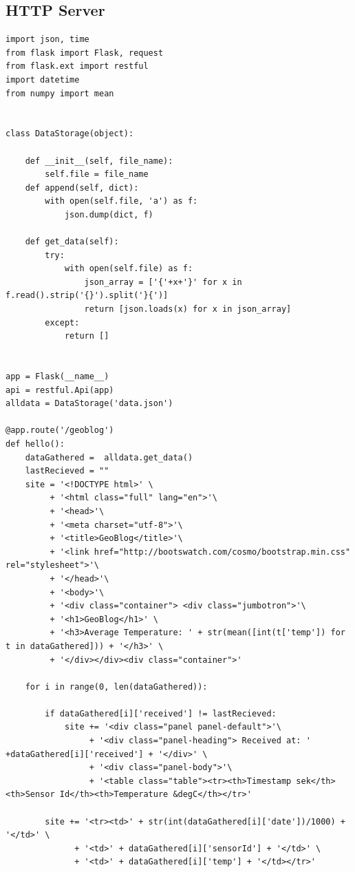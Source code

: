 \subsection*{HTTP Server}
\begin{lstlisting}[frame=single, label=httpCode, caption={Code for the HTTP server language=Python}]
import json, time
from flask import Flask, request
from flask.ext import restful
import datetime
from numpy import mean


class DataStorage(object):
    
    def __init__(self, file_name):
        self.file = file_name
    def append(self, dict):
        with open(self.file, 'a') as f:
            json.dump(dict, f)

    def get_data(self):
        try:
            with open(self.file) as f:
                json_array = ['{'+x+'}' for x in f.read().strip('{}').split('}{')]
                return [json.loads(x) for x in json_array]
        except:
            return []      


app = Flask(__name__)
api = restful.Api(app)
alldata = DataStorage('data.json')

@app.route('/geoblog')
def hello():
    dataGathered =  alldata.get_data()
    lastRecieved = ""
    site = '<!DOCTYPE html>' \
         + '<html class="full" lang="en">'\
         + '<head>'\
         + '<meta charset="utf-8">'\
         + '<title>GeoBlog</title>'\
         + '<link href="http://bootswatch.com/cosmo/bootstrap.min.css" rel="stylesheet">'\
         + '</head>'\
         + '<body>'\
         + '<div class="container"> <div class="jumbotron">'\
         + '<h1>GeoBlog</h1>' \
         + '<h3>Average Temperature: ' + str(mean([int(t['temp']) for t in dataGathered])) + '</h3>' \
         + '</div></div><div class="container">'

    for i in range(0, len(dataGathered)):
        
        if dataGathered[i]['received'] != lastRecieved:
            site += '<div class="panel panel-default">'\
                 + '<div class="panel-heading"> Received at: ' +dataGathered[i]['received'] + '</div>' \
                 + '<div class="panel-body">'\
                 + '<table class="table"><tr><th>Timestamp sek</th><th>Sensor Id</th><th>Temperature &degC</th></tr>'

        site += '<tr><td>' + str(int(dataGathered[i]['date'])/1000) + '</td>' \
              + '<td>' + dataGathered[i]['sensorId'] + '</td>' \
              + '<td>' + dataGathered[i]['temp'] + '</td></tr>'
        

\end{lstlisting}
